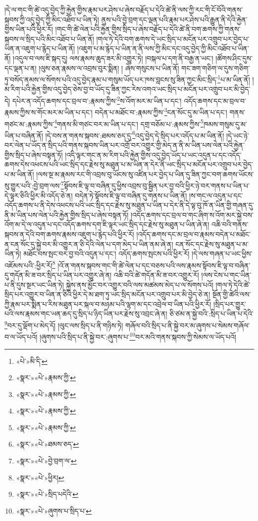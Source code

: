 །དེ་ལ་གང་གི་ཚེ་འདུ་བྱེད་ཀྱི་རྐྱེན་གྱིས་རྣམ་པར་ཤེས་པ་ཞེས་བརྗོད་པ་དེའི་ཚེ་ནི་ལས་ཀྱི་རང་གི་ངོ་བོའི་གནས་སྐབས་ཀྱི་འདུ་བྱེད་ཀྱི་མིང་འཐོབ་པ་ཡིན་ཏེ། ནུས་པའི་བྱེ་བྲག་དང་ལྡན་པའི་རྣམ་པར་ཤེས་པའི་རྒྱུན་ནི་དེའི་རྐྱེན་གྱིས་ཡིན་པའི་ཕྱིར་རོ། །གང་གི་ཚེ་ལེན་པའི་རྐྱེན་གྱིས་སྲིད་པ་ཞེས་བརྗོད་པ་དེའི་ཚེ་ནི་བག་ཆགས་ཀྱི་གནས་སྐབས་ལ་སྲིད་པའི་མིང་འཐོབ་པ་ཡིན་ནོ། །གལ་ཏེ་དེའི་བག་ཆགས་དེ་ཡང་སྲིད་པ་མངོན་པར་འགྲུབ་པར་བྱེད་པ་ཡིན་ན་འཇུག་པ་རྙེད་པ་ཡིན་ནོ། །འཇུག་པ་མ་རྙེད་པ་ཡིན་ན་ནི་ལས་ཀྱི་མིང་དང་འདུ་བྱེད་ཀྱི་མིང་འཐོབ་པ་ཡིན་ནོ། །འདུལ་བ་ལས་ཇི་སྐད་དུ། ལས་རྣམས་ཆུད་ཟར་མི་འགྱུར་ཏེ། །བསྐལ་པ་དག་ནི་བརྒྱ་ན་ཡང་། །ཚོགས་ཤིང་དུས་དང་ལྡན་པ་ན། །ལུས་ཅན་རྣམས་ལ་འབྲས་བུར་སྨིན། །
ཞེས་གསུངས་པ་ཡིན་ནོ། གང་ཟག་གཅིག་ལ་དུས་གཅིག་ཏུ་བསོད་ནམས་ལ་སོགས་པའི་འདུ་བྱེད་རྣམ་པ་གསུམ་ཡོད་པར་ཁས་བླངས་སུ་ཟིན་ཀྱང་མིང་སྲིད་\footnote{«པེ་»མི་ིད་}པ་མ་ཡིན་ནོ། །མ་རིག་པའི་རྐྱེན་གྱིས་འདུ་བྱེད་ཅེས་བྱ་བ་ཡོད་དུ་ཟིན་ཀྱང་རེས་འགའ་ཡང་སྲིད་པ་མངོན་པར་འགྲུབ་པར་མི་བྱེད་དེ། དཔེར་ན་འདོད་ཆགས་དང་བྲལ་བ་:རྣམས་ཀྱིས་\footnote{«སྣར་»«པེ་»རྣམས་ཀྱི་}ས་འོག་མར་མ་ཡིན་པ་དང་། འདོད་ཆགས་དང་མ་བྲལ་བ་རྣམས་ཀྱིས་ས་གོང་མར་མ་ཡིན་པ་དང་། བདེན་པ་མཐོང་བ་:རྣམས་ཀྱིས་\footnote{«སྣར་»«པེ་»རྣམས་ཀྱི་}ངན་སོང་དུ་མ་ཡིན་པ་དང་། གནས་གཙང་མ་:རྣམས་ཀྱིས་\footnote{«སྣར་»«པེ་»རྣམས་ཀྱི་}གནས་མི་གཙང་བར་མ་ཡིན་པ་དང་། དགྲ་བཅོམ་པ་:རྣམས་ཀྱིས་\footnote{«སྣར་»«པེ་»རྣམས་ཀྱི་}ཁམས་གསུམ་དུ་མ་ཡིན་པ་བཞིན་ནོ། །དེ་བས་ན་གནས་སྐབས་:ཐམས་ཅད་དུ་\footnote{«སྣར་»«པེ་»ཐམས་ཅད་}འདུ་བྱེད་དེ་སྲིད་པར་འདོད་པ་མ་ཡིན་ནོ། །དེ་ཡང་ཉེ་བར་ལེན་པ་ཡོད་ན་སྲིད་པའི་གནས་སྐབས་ཡིན་པར་འགྲོ་བར་འགྱུར་གྱི་མེད་ན་ནི་མ་ཡིན་པས་ལེན་པའི་རྐྱེན་གྱིས་སྲིད་པ་ཞེས་བསྟན་ཏོ། །འདི་ལྟར་གང་ན་མ་རིག་པའི་རྐྱེན་གྱིས་འདུ་བྱེད་ཡོད་པ་ཡང་འདུན་པ་དང་འདོད་ཆགས་དེས་འཕངས་པའི་ཡང་སྲིད་དང་རྗེས་སུ་མཐུན་པ་མ་ཡིན་ན་དེར་ནི་ཡང་སྲིད་པ་མངོན་པར་འགྲུབ་པར་བྱེད་པ་མ་ཡིན་ནོ། །ལས་སྔ་མ་རྣམས་རང་གི་འབྲས་བུ་ཡོངས་སུ་འཛིན་པར་བྱེད་པ་ཡིན་དུ་ཟིན་ཀྱང་བག་ཆགས་ཡོངས་སུ་གྱུར་པའི་:བྱེ་བྲག་ལས་\footnote{«སྣར་»«པེ་»བྱེ་བྲག་ལ་}སྟོབས་ཇི་ལྟ་བ་བཞིན་དུ་ཕྱིས་འབྲས་བུ་སྦྱིན་པར་བྱ་བའི་ཕྱིར་ཉེ་བར་གནས་པ་ཡིན་པ་དེ་ལྟར་ཅིའི་ཕྱིར་མི་འདོད་ཅེ་ན། བདེན་ཏེ་སྟོབས་ཇི་ལྟ་བ་བཞིན་དུ་གནས་པ་ཡིན་ནོ། །ས་གང་ལ་འདུན་པ་དང་འདོད་ཆགས་པ་ནི་དེས་འཕངས་པའི་ཡང་སྲིད་དང་རྗེས་སུ་མཐུན་པ་ཡིན་པ་དེར་ནི་དེ་ལྟ་བུ་ཁོ་ན་ཡིན་གྱི་གཞན་དུ་ནི་མ་ཡིན་པས་ལེན་པའི་རྐྱེན་གྱིས་སྲིད་པ་ཞེས་བསྟན་ཏོ། །འདོད་ཆགས་དང་བྲལ་བ་གང་ཞིག་ས་འོག་མར་སྐྱེ་བས་འོག་མ་དེ་ལ་འདུན་པ་དང་འདོད་ཆགས་དག་ཇི་ལྟར་ཡང་སྲིད་དང་རྗེས་སུ་མཐུན་པ་ཡིན་ཞེ་ན། འཆི་བའི་གནས་སྐབས་ན་དེའི་བག་ཆགས་རྣམས་འཇུག་པ་རྙེད་པའི་ཕྱིར་རོ། །འདོད་ཆགས་དང་མ་བྲལ་བ་རྣམས་བདེན་པ་མཐོང་ན་ངན་སོང་དུ་སྐྱེ་བར་མི་འགྱུར་ན་ཅི་དེའི་ལེན་པ་དག་མེད་པ་ཡིན་ནམ་ཞེ་ན། ངན་སོང་དང་རྗེས་སུ་མཐུན་པ་མ་ཡིན་ཏེ། མཐོང་བས་སྤང་བར་བྱ་བའི་འདུན་པ་དང་། འདོད་ཆགས་སྤངས་པའི་ཕྱིར་རོ། །དེ་ལས་གཞན་པ་ཡང་ཕྱིས་འཇོམས་པའི་:ཕྱིར་རོ།\footnote{«སྣར་»«པེ་»ཕྱིར།} །འོ་ན་གནས་སྐབས་གང་གི་ཚེ་ལེན་པ་དང་བཅས་པའི་ལས་རྣམས་སྟོབས་ཇི་ལྟ་བ་བཞིན་དུ་གདོན་མི་ཟ་བར་སྲིད་པ་ཡིན་པར་འགྱུར་ཞེ་ན། འཆི་བའི་ཚེ་གདོན་མི་ཟ་བར་འགྱུར་རོ། །ལས་ངེས་པ་གང་ཡིན་པ་ནི་དུས་སྔར་ཡང་ཡིན་ཏེ། སྐྱེས་ནས་མྱོང་བར་འགྱུར་བའི་ལས་མཚམས་མེད་པ་ལ་སོགས་པའོ། །གལ་ཏེ་དེའི་ཚེ་སྲིད་པར་འགྱུར་བ་ཡིན་ན་ཅིའི་ཕྱིར་དེ་མ་ཐག་ཏུ་ཡང་སྲིད་མངོན་པར་འགྲུབ་པར་མི་བྱེད་ཅེ་ན། སྔོན་གྱི་ཚེའི་ལས་ཀྱི་རྣམ་པར་སྨིན་པ་རིས་མཐུན་པར་སྐལ་བ་མཉམ་པའི་ལྷག་མ་དང་འབྲེལ་བ་ཡིན་པའི་ཕྱིར་རོ། །སྲིད་པར་གྱུར་པའི་ལས་རྣམས་གང་ཡན་ཆད་དུ་སྲིད་པ་ཉིད་ཡིན་པར་རྗེས་སུ་འབྲང་ཞེ་ན། ཅི་ཙམ་ན་སྐྱེ་བའི་:སྲིད་པ་ཡིན་པ་དེའི་\footnote{«སྣར་»«པེ་»སྲིད་པདེའི་}བར་དུ་ལྡོག་པ་མེད་དོ། །ལུང་ལས་སྲིད་པ་ནི་གཉིས་ཏེ། གཞོལ་བའི་སྲིད་པ་ནི་སྐྱེ་བར་མ་ཞུགས་པ་སེམས་གཞོལ་བ་ལ་ཡོད་པའོ། །ཞུགས་པའི་སྲིད་པ་ནི་སྐྱེ་བར་:ཞུགས་པ་\footnote{«སྣར་»«པེ་»ཞུགས་པ་སྲིད་པ་}བར་མའི་གནས་སྐབས་ཀྱི་སེམས་ལ་ཡོད་པའོ། 